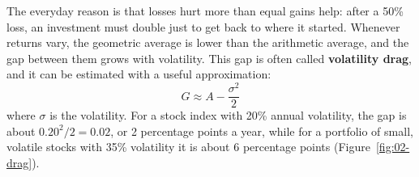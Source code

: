 The everyday reason is that losses hurt more than equal gains help: after a 50\% loss, an investment must double just to get back to where it started. Whenever returns vary, the geometric average is lower than the arithmetic average, and the gap between them grows with volatility. This gap is often called \textbf{volatility drag}, and it can be estimated with a useful approximation:
\begin{equation}
  G \approx A - \frac{\sigma^2}{2}
  \label{eq:02-drag}
\end{equation}
where $\sigma$ is the volatility. For a stock index with 20\% annual volatility, the gap is about $0.20^2/2 = 0.02$, or 2 percentage points a year, while for a portfolio of small, volatile stocks with 35\% volatility it is about 6 percentage points (Figure~\ref{fig:02-drag}).




